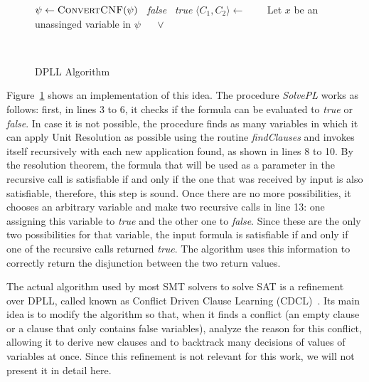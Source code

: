 \begin{figure}[t]
\begin{algorithmic}[1]
\State $\psi \gets \Call{ConvertCNF}{\psi}$
  \State \Return~\textit{false}
  \State \Return~\textit{true}
\Else
    \State $\langle C_{1}, C_{2} \rangle \gets$  
    \State~\Return~
  \Else
    \State~Let $x$ be an unassinged variable in $\psi$
    \State~\Return~ $\vee$ 
  \EndIf
\EndIf
\EndFunction
\end{algorithmic}
\caption{DPLL Algorithm}~\label{dpllAlgo}
\end{figure}

Figure~\ref{dpllAlgo} shows an implementation of this idea. The procedure \textit{SolvePL} works as follows: first, in lines 3 to 6, it checks if the formula can be evaluated to \textit{true} or \textit{false}. In case it is not possible, the procedure finds as many variables in which it can apply Unit Resolution as possible using the routine \textit{findClauses} and invokes itself recursively with each new application found, as shown in lines 8 to 10. By the resolution theorem, the formula that will be used as a parameter in the recursive call is satisfiable if and only if the one that was received by input is also satisfiable, therefore, this step is sound. Once there are no more possibilities, it chooses an arbitrary variable and make two recursive calls in line 13: one assigning this variable to \textit{true} and the other one to \textit{false}. Since these are the only two possibilities for that variable, the input formula is satisfiable if and only if one of the recursive calls returned \textit{true}. The algorithm uses this information to correctly return the disjunction between the two return values.

The actual algorithm used by most SMT solvers to solve SAT is a refinement over DPLL, called known as Conflict Driven Clause Learning (CDCL)~\cite{cdcl}. Its main idea is to modify the algorithm so that, when it finds a conflict (an empty clause or a clause that only contains false variables), analyze the reason for this conflict, allowing it to derive new clauses and to backtrack many decisions of values of variables at once. Since this refinement is not relevant for this work, we will not present it in detail here.

